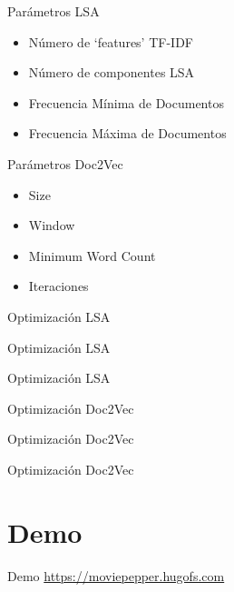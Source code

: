 \documentclass[table]{beamer}
\begin{document}
  \begin{frame}{Parámetros LSA}
      \begin{itemize}
          \item Número de `features' TF-IDF
          \item Número de componentes LSA
          \item Frecuencia Mínima de Documentos
          \item Frecuencia Máxima de Documentos
      \end{itemize}
  \end{frame}

  \begin{frame}{Parámetros Doc2Vec}
      \begin{itemize}
          \item Size
          \item Window
          \item Minimum Word Count
          \item Iteraciones
      \end{itemize}
  \end{frame}

  \begin{frame}{Optimización LSA}
      \tiny
      \centering
      
  \end{frame}

  \begin{frame}{Optimización LSA}
      \tiny
      \centering
      
  \end{frame}

  \begin{frame}{Optimización LSA}
      \tiny
      \centering
      
  \end{frame}

  \begin{frame}{Optimización Doc2Vec}
      \tiny
      \centering
      
  \end{frame}

  \begin{frame}{Optimización Doc2Vec}
      \tiny
      \centering
      
  \end{frame}

  \begin{frame}{Optimización Doc2Vec}
      \tiny
      \centering
      
  \end{frame}

  \section{Demo}

  \begin{frame}{Demo}
      \url{https://moviepepper.hugofs.com}
  \end{frame}
\end{document}
